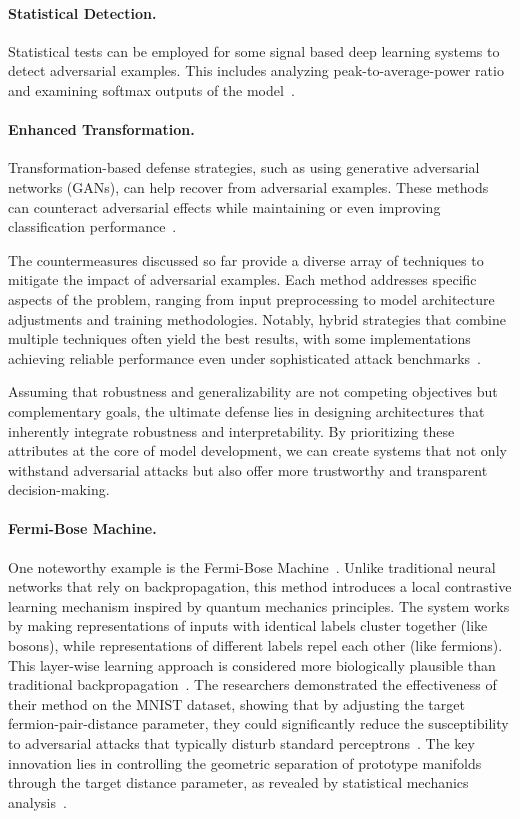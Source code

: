 \documentclass[a4paper, oneside]{discothesis}
\begin{document}
\paragraph{Statistical Detection.} Statistical tests can be employed for some signal based deep learning systems to detect adversarial examples. This includes analyzing peak-to-average-power ratio and examining softmax outputs of the model~\cite{KokaljFilipovic2019AdversarialEI}.

\paragraph{Enhanced Transformation.} Transformation-based defense strategies, such as using generative adversarial networks (GANs), can help recover from adversarial examples. These methods can counteract adversarial effects while maintaining or even improving classification performance~\cite{Zhao2023EITGANAT}.

The countermeasures discussed so far provide a diverse array of techniques to mitigate the impact of adversarial examples. Each method addresses specific aspects of the problem, ranging from input preprocessing to model architecture adjustments and training methodologies. Notably, hybrid strategies that combine multiple techniques often yield the best results, with some implementations achieving reliable performance even under sophisticated attack benchmarks~\cite{ji2023benchmarking}.

Assuming that robustness and generalizability are not competing objectives but complementary goals, the ultimate defense lies in designing architectures that inherently integrate robustness and interpretability. By prioritizing these attributes at the core of model development, we can create systems that not only withstand adversarial attacks but also offer more trustworthy and transparent decision-making.

\paragraph{Fermi-Bose Machine.} One noteworthy example is the Fermi-Bose Machine~\cite{xie2024fermi}. Unlike traditional neural networks that rely on backpropagation, this method introduces a local contrastive learning mechanism inspired by quantum mechanics principles. The system works by making representations of inputs with identical labels cluster together (like bosons), while representations of different labels repel each other (like fermions). This layer-wise learning approach is considered more biologically plausible than traditional backpropagation~\cite{xie2024fermi}. The researchers demonstrated the effectiveness of their method on the MNIST dataset, showing that by adjusting the target fermion-pair-distance parameter, they could significantly reduce the susceptibility to adversarial attacks that typically disturb standard perceptrons~\cite{xie2024fermi}. The key innovation lies in controlling the geometric separation of prototype manifolds through the target distance parameter, as revealed by statistical mechanics analysis~\cite{xie2024fermi}.
\end{document}
